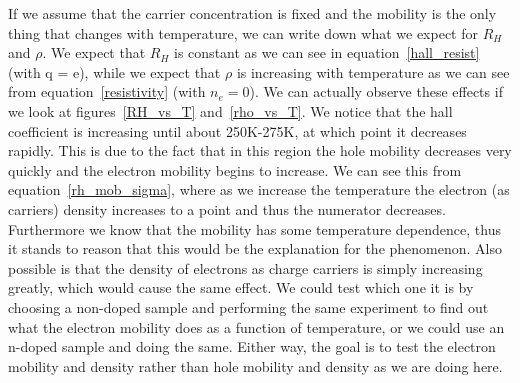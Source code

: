 \documentclass[reprint, nobibnotes, amssymb, amsmath, amsfonts, physics, mathtools, mathrsfs, floatfix]{revtex4-1}
\begin{document}
    If we assume that the carrier concentration is fixed and the mobility is the only thing that changes with temperature, we can write down what we expect for $R_H$ and $\rho$.  We expect that $R_H$ is constant as we can see in equation~\ref{hall_resist} (with q = e), while we expect that $\rho$ is increasing with temperature as we can see from equation~\ref{resistivity} (with $n_e = 0$).  We can actually observe these effects if we look at figures~\ref{RH_vs_T} and~\ref{rho_vs_T}.  We notice that the hall coefficient is increasing until about 250K-275K, at which point it decreases rapidly.  This is due to the fact that in this region the hole mobility decreases very quickly and the electron mobility begins to increase.  We can see this from equation~\ref{rh_mob_sigma}, where as we increase the temperature the electron (as carriers) density increases to a point and thus the numerator decreases. Furthermore we know that the mobility has some temperature dependence, thus it stands to reason that this would be the explanation for the phenomenon.  Also possible is that the density of electrons as charge carriers is simply increasing greatly, which would cause the same effect.  We could test which one it is by choosing a non-doped sample and performing the same experiment to find out what the electron mobility does as a function of temperature, or we could use an n-doped sample and doing the same.  Either way, the goal is to test the electron mobility and density rather than hole mobility and density as we are doing here.
\end{document}
